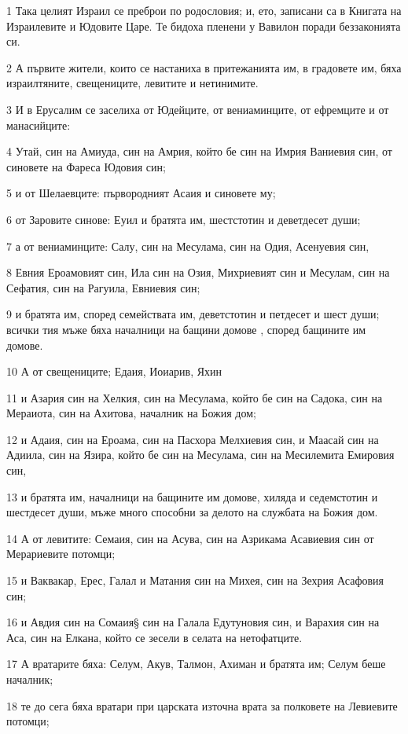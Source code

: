 \par 1 Така целият Израил се преброи по родословия; и, ето, записани са в Книгата на Израилевите и Юдовите Царе. Те бидоха пленени у Вавилон поради беззаконията си.
\par 2 А първите жители, които се настаниха в притежанията им, в градовете им, бяха израилтяните, свещениците, левитите и нетинимите.
\par 3 И в Ерусалим се заселиха от Юдейците, от вениаминците, от ефремците и от манасийците:
\par 4 Утай, син на Амиуда, син на Амрия, който бе син на Имрия Ваниевия син, от синовете на Фареса Юдовия син;
\par 5 и от Шелаевците: първородният Асаия и синовете му;
\par 6 от Заровите синове: Еуил и братята им, шестстотин и деветдесет души;
\par 7 а от вениаминците: Салу, син на Месулама, син на Одия, Асенуевия син,
\par 8 Евния Ероамовият син, Ила син на Озия, Михриевият син и Месулам, син на Сефатия, син на Рагуила, Евниевия син;
\par 9 и братята им, според семействата им, деветстотин и петдесет и шест души; всички тия мъже бяха началници на бащини домове , според бащините им домове.
\par 10 А от свещениците; Едаия, Иоиарив, Яхин
\par 11 и Азария син на Хелкия, син на Месулама, който бе син на Садока, син на Мераиота, син на Ахитова, началник на Божия дом;
\par 12 и Адаия, син на Ероама, син на Пасхора Мелхиевия син, и Маасай син на Адиила, син на Язира, който бе син на Месулама, син на Месилемита Емировия син,
\par 13 и братята им, началници на бащините им домове, хиляда и седемстотин и шестдесет души, мъже много способни за делото на службата на Божия дом.
\par 14 А от левитите: Семаия, син на Асува, син на Азрикама Асавиевия син от Мерариевите потомци;
\par 15 и Ваквакар, Ерес, Галал и Матания син на Михея, син на Зехрия Асафовия син;
\par 16 и Авдия син на Сомаия§ син на Галала Едутуновия син, и Варахия син на Аса, син на Елкана, който се зесели в селата на нетофатците.
\par 17 А вратарите бяха: Селум, Акув, Талмон, Ахиман и братята им; Селум беше началник;
\par 18 те до сега бяха вратари при царската източна врата за полковете на Левиевите потомци;
